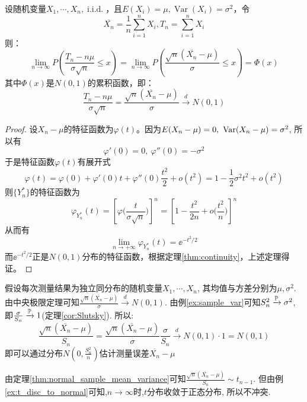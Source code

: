 \begin{theorem}\label{thm:central_limit_Classical}
    设随机变量$X_1,\cdots ,X_n,\operatorname{i.i.d.}$，且$E(X_i)=\mu,\operatorname{Var}(X_i)=\sigma^2$，令
    \[ \overline{X_n} = \frac1n\sum_{i=1}^n X_i, T_n=\sum_{i=1}^n X_i\]
    则：
    \[ \lim_{n \to \infty}P(\frac{T_n-n \mu}{\sigma\sqrt{n}}\le x)=\lim_{n \to \infty}P(\frac{\sqrt{n}(\overline{X_n}-\mu)}{\sigma}\le x) =\Phi(x)\]
    其中$\Phi(x)$是$N(0,1)$的累积函数，即：
    \[ \frac{T_n-n \mu}{\sigma\sqrt{n}}=\frac{\sqrt{n}(\overline{X_n}-\mu)}{\sigma} \xrightarrow{d} N(0,1)\]
\end{theorem}
\begin{proof}
    设$X_n - \mu$的特征函数为$\varphi(t)$。因为$E( X_n - \mu ) = 0 ,\ \Var(X_n - \mu ) = \sigma^2$, 所以有
    \[ \varphi'(0) = 0, \ \varphi''(0) = - \sigma^2 \]
    于是特征函数$\varphi(t)$有展开式
    \[ \varphi(t) = \varphi(0) + \varphi'(0) t + \varphi''(0) \frac{t^2}{2} + o(t^2)= 1 - \frac{1}{2} \sigma^2 t^2 + o(t^2) \]
    则$\{ Y_n^* \}$的特征函数为
    \[ \varphi_{Y_n^*}(t) = \left[ \varphi \biggl( \frac{t}{\sigma \sqrt{n}} \biggr) \right] ^n = \left[ 1 - \frac{t^2}{2n} + o \biggl( \frac{t^2}{n} \biggr) \right]^n  \]
    从而有
    \[ \lim_{n \to +\infty} \varphi_{Y_n^*}(t) = \ee^{-t^2/2} \]
    而$\ee^{-t^2/2}$正是$N(0,1)$分布的特征函数，根据定理\ref{thm:continuity}，上述定理得证。
\end{proof}

\begin{example}[测量误差估计]
    假设每次测量结果为独立同分布的随机变量$X_1,\cdots ,X_n$, 其均值与方差分别为$\mu,\sigma^2$. 由中央极限定理可知$\frac{\sqrt{n}(\overline{X_n}-\mu)}{\sigma} \xrightarrow{d} N(0,1)$. 由例\ref{ex:sample_var}可知$S_n^2 \xrightarrow{\P} \sigma^2$, 即$\frac{\sigma}{S_n} \xrightarrow{\P} 1$(定理\ref{cor:Slutsky}). 所以:
    \[ \frac{\sqrt{n}(\overline{X_n}-\mu)}{S_n}=\frac{\sqrt{n}(\overline{X_n}-\mu)}{\sigma}\frac{\sigma}{S_n} \xrightarrow{d} N(0,1)\cdot 1=N(0,1) \]
    即可以通过分布$N(0,\frac{S_n^2}{n})$估计测量误差$\overline{X_n}-\mu$
\end{example}
\begin{remark}
    由定理\ref{thm:normal_sample_mean_variance}可知$\frac{\sqrt{n}(\overline{X_n}-\mu)}{S_n} \sim t_{n-1}$. 但由例\ref{ex:t_disc_to_normal}可知,$n\to \infty$时,$t$分布收敛于正态分布, 所以不冲突.
\end{remark}


